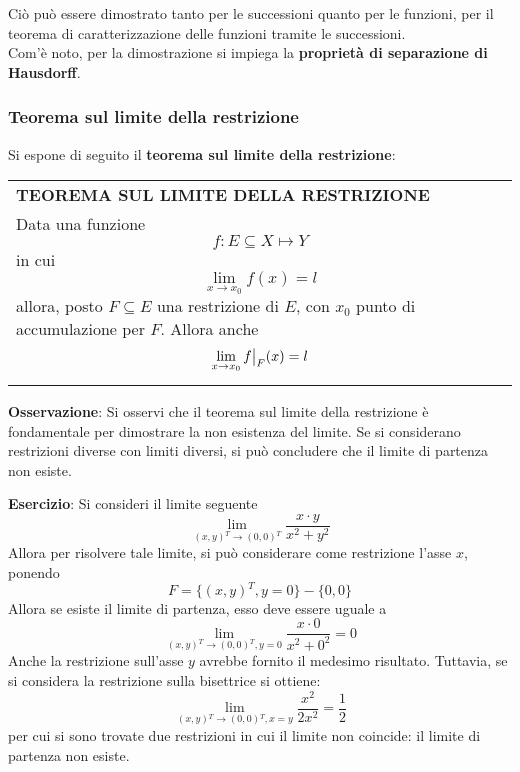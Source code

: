 \documentclass[a4paper]{extarticle}
\renewcommand\arraystretch{}
\newcommand\restr[2]{{%
  \left.\kern-\nulldelimiterspace %
  #1 %
  \vphantom{\big|} %
  \right|_{#2} %
  }}
\begin{document}
\vspace{2em}
\noindent
Ciò può essere dimostrato tanto per le successioni quanto per le funzioni, per il teorema di caratterizzazione delle funzioni tramite le successioni.\\
Com'è noto, per la dimostrazione si impiega la \textbf{proprietà di separazione di Hausdorff}.

\vspace{1em}
\noindent
\subsubsection{Teorema sul limite della restrizione}
Si espone di seguito il \textbf{teorema sul limite della restrizione}:

\vspace{1em}
\setlength{\tabcolsep}{14pt}
\renewcommand{\arraystretch}{2}
\noindent
\begin{tabularx}{\textwidth}{@{}|P|@{}}
    \hline
    {\textbf{TEOREMA SUL LIMITE DELLA RESTRIZIONE}}\\
    \parbox{\linewidth}{Data una funzione
    \[f : E \subseteq X \longmapsto Y\]
    in cui
    \[\lim_{x \to x_0} f(x) = l\]
    allora, posto $F \subseteq E$ una restrizione di $E$, con $x_0$ punto di accumulazione per $F$. Allora anche
    \[\lim_{x \to x_0} \restr{f}{F}(x)=l\]
    \vspace{-1mm}}\\
    \hline
\end{tabularx}

\vspace{2em}
\noindent
\textbf{Osservazione}: Si osservi che il teorema sul limite della restrizione è fondamentale per dimostrare la non esistenza del limite. Se si considerano restrizioni diverse con limiti diversi, si può concludere che il limite di partenza non esiste.

\vspace{2em}
\noindent
\textbf{Esercizio}: Si consideri il limite seguente
\[\lim_{(x,y){^T} \to (0,0){^T}} \frac{x \cdot y}{x^2 + y^2}\]
Allora per risolvere tale limite, si può considerare come restrizione l'asse $x$, ponendo
\[F = \{(x,y){^T}, y=0\} - \{0,0\}\]
Allora se esiste il limite di partenza, esso deve essere uguale a
\[\lim_{(x,y){^T} \to (0,0){^T}, y=0} \frac{x \cdot 0}{x^2 + 0^2} = 0\]
Anche la restrizione sull'asse $y$ avrebbe fornito il medesimo risultato. Tuttavia, se si considera la restrizione sulla bisettrice si ottiene:
\[\lim_{(x,y){^T} \to (0,0){^T}, x=y} \frac{x^2}{2x^2} = \frac{1}{2}\]
per cui si sono trovate due restrizioni in cui il limite non coincide: il limite di partenza non esiste.
\end{document}
